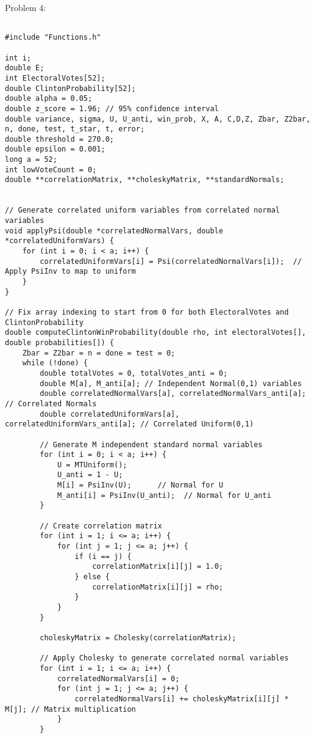 \documentclass{report}
\begin{document}
Problem 4:
\begin{lstlisting}

#include "Functions.h"

int i;
double E;
int ElectoralVotes[52];
double ClintonProbability[52];
double alpha = 0.05;
double z_score = 1.96; // 95% confidence interval
double variance, sigma, U, U_anti, win_prob, X, A, C,D,Z, Zbar, Z2bar, n, done, test, t_star, t, error; 
double threshold = 270.0;
double epsilon = 0.001;
long a = 52;
int lowVoteCount = 0;
double **correlationMatrix, **choleskyMatrix, **standardNormals;


// Generate correlated uniform variables from correlated normal variables
void applyPsi(double *correlatedNormalVars, double *correlatedUniformVars) {
    for (int i = 0; i < a; i++) {
        correlatedUniformVars[i] = Psi(correlatedNormalVars[i]);  // Apply PsiInv to map to uniform
    }
}

// Fix array indexing to start from 0 for both ElectoralVotes and ClintonProbability
double computeClintonWinProbability(double rho, int electoralVotes[], double probabilities[]) {
    Zbar = Z2bar = n = done = test = 0;
    while (!done) {
        double totalVotes = 0, totalVotes_anti = 0;
        double M[a], M_anti[a]; // Independent Normal(0,1) variables
        double correlatedNormalVars[a], correlatedNormalVars_anti[a]; // Correlated Normals
        double correlatedUniformVars[a], correlatedUniformVars_anti[a]; // Correlated Uniform(0,1)

        // Generate M independent standard normal variables
        for (int i = 0; i < a; i++) {
            U = MTUniform();
            U_anti = 1 - U;
            M[i] = PsiInv(U);      // Normal for U
            M_anti[i] = PsiInv(U_anti);  // Normal for U_anti
        }

        // Create correlation matrix 
        for (int i = 1; i <= a; i++) {
            for (int j = 1; j <= a; j++) {
                if (i == j) {
                    correlationMatrix[i][j] = 1.0;
                } else {
                    correlationMatrix[i][j] = rho;
                }
            }
        }

        choleskyMatrix = Cholesky(correlationMatrix);

        // Apply Cholesky to generate correlated normal variables
        for (int i = 1; i <= a; i++) {
            correlatedNormalVars[i] = 0;
            for (int j = 1; j <= a; j++) {
                correlatedNormalVars[i] += choleskyMatrix[i][j] * M[j]; // Matrix multiplication
            }
        }


\end{lstlisting}
\end{document}
